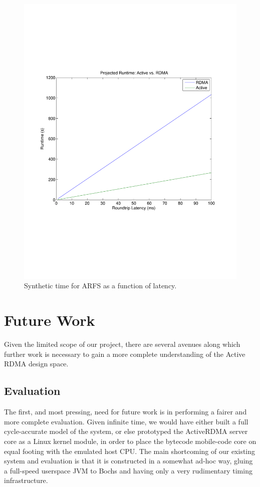 \documentclass[10pt]{article}
\begin{document}
\begin{figure}
  \centering
\includegraphics[scale=0.5, trim = 0 200 0 200]{../../results/matlab/synth_time.pdf}
\caption{Synthetic time for ARFS as a function of
  latency.}\label{synth_time}
\end{figure}



\section{Future Work}

Given the limited scope of our project, there are several avenues
along which further work is necessary to gain a more complete
understanding of the Active RDMA design space.

\subsection{Evaluation}

The first, and most pressing, need for future work is in performing a
fairer and more complete evaluation. Given infinite time, we would
have either built a full cycle-accurate model of the system, or else
prototyped the ActiveRDMA server core as a Linux kernel module, in
order to place the bytecode mobile-code core on equal footing with the
emulated host CPU. The main shortcoming of our existing system and
evaluation is that it is constructed in a somewhat ad-hoc way, gluing
a full-speed userspace JVM to Bochs and having only a very rudimentary
timing infrastructure.
\end{document}

